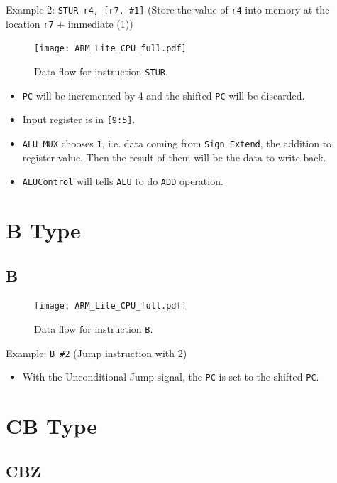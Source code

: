 \documentclass[11pt,fancy,bibstyle=ieee]{elegantbook}
\begin{document}
      Example 2: \texttt{STUR r4, [r7, \#1]} (Store the value of \texttt{r4} into memory at the location \texttt{r7} + immediate (1))

      \begin{figure}[htbp]
        \centering
        \texttt{[image: ARM\_Lite\_CPU\_full.pdf]}
        \caption{Data flow for instruction \texttt{STUR}.}
        \label{fig:CPU_p3}
      \end{figure}

      \begin{itemize}
        \item \texttt{PC} will be incremented by 4 and the shifted \texttt{PC} will be discarded.
        \item Input register is in \texttt{[9:5]}.
        \item \texttt{ALU MUX} chooses \texttt{1}, i.e. data coming from \texttt{Sign Extend}, the addition to register value. Then the result of them will be the data to write back.
        \item \texttt{ALUControl} will tells \texttt{ALU} to do \texttt{ADD} operation.
      \end{itemize}

  \section{B Type}
    \subsection{B}

      \begin{figure}[htbp]
        \centering
        \texttt{[image: ARM\_Lite\_CPU\_full.pdf]}
        \caption{Data flow for instruction \texttt{B}.}
        \label{fig:CPU_p6}
      \end{figure}

      Example: \texttt{B \#2} (Jump instruction with 2)

      \begin{itemize}
        \item With the Unconditional Jump signal, the \texttt{PC} is set to the shifted \texttt{PC}.
      \end{itemize}

  \section{CB Type}
    \subsection{CBZ}
\end{document}
